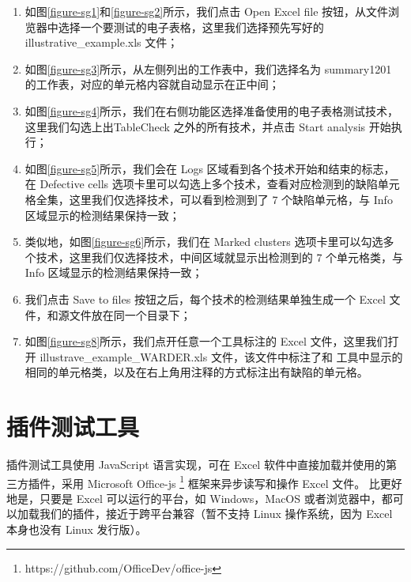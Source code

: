 





% 


\begin{enumerate}
    \item 如图\ref{figure-sg1}和\ref{figure-sg2}所示，我们点击 Open Excel file 按钮，从文件浏览器中选择一个要测试的电子表格，这里我们选择预先写好的 illustrative\_example.xls 文件；
    \item 如图\ref{figure-sg3}所示，从左侧列出的工作表中，我们选择名为 summary1201 的工作表，对应的单元格内容就自动显示在正中间；
    \item 如图\ref{figure-sg4}所示，我们在右侧功能区选择准备使用的电子表格测试技术，这里我们勾选上出TableCheck 之外的所有技术，并点击 Start analysis 开始执行；
    \item 如图\ref{figure-sg5}所示，我们会在 Logs 区域看到各个技术开始和结束的标志，在 Defective cells 选项卡里可以勾选上多个技术，查看对应检测到的缺陷单元格全集，这里我们仅选择\wa 技术，可以看到\wa 检测到了 7 个缺陷单元格，与 Info 区域显示的检测结果保持一致；
    \item 类似地，如图\ref{figure-sg6}所示，我们在 Marked clusters 选项卡里可以勾选多个技术，这里我们仅选择\wa 技术，中间区域就显示出\wa 检测到的 7 个单元格类，与 Info 区域显示的检测结果保持一致；
    \item 我们点击 Save to files 按钮之后，每个技术的检测结果单独生成一个 Excel 文件，和源文件放在同一个目录下；
    \item 如图\ref{figure-sg8}所示，我们点开任意一个工具标注的 Excel 文件，这里我们打开 illustrave\_example\_WARDER.xls 文件，该文件中标注了和 \sg 工具中显示的相同的单元格类，以及在右上角用注释的方式标注出有缺陷的单元格。
\end{enumerate}


\section{\eg 插件测试工具}

\eg 插件测试工具使用 JavaScript 语言实现，可在 Excel 软件中直接加载并使用的第三方插件，采用 Microsoft Office-js \footnote{https://github.com/OfficeDev/office-js} 框架来异步读写和操作 Excel 文件。
比\sg 更好地是，只要是 Excel 可以运行的平台，如 Windows，MacOS 或者浏览器中，都可以加载我们的\eg 插件，接近于跨平台兼容（暂不支持 Linux 操作系统，因为 Excel 本身也没有 Linux 发行版）。

